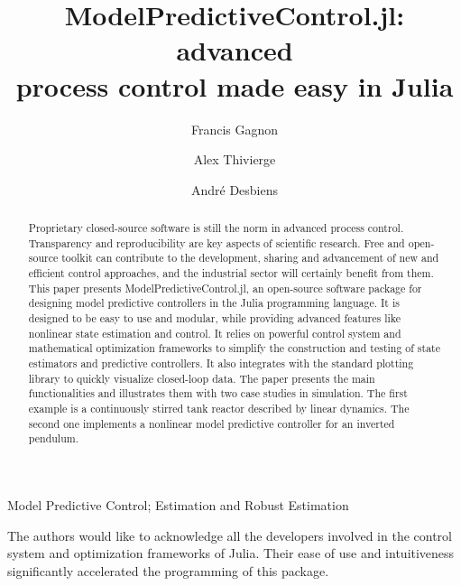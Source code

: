 \documentclass{ifacconf}
\begin{document}
\begin{frontmatter}

\title{ModelPredictiveControl.jl: advanced\\process control made easy in Julia}

\author[First]{Francis Gagnon} 
\author[First]{Alex Thivierge} 
\author[Second]{André Desbiens}
\author[Third]{}

\address[First]{Jumine Inc., Quebec City, QC, G1S 2K4, Canada}
\address[Second]{Process Observation and Optimization Laboratory (LOOP), Université Laval, Quebec City, QC, G1V 0A6, Canada}
\address[Third]{}

\begin{abstract} 
Proprietary closed-source software is still the norm in advanced process control. Transparency and reproducibility are key aspects of scientific research. Free and open-source toolkit can contribute to the development, sharing and advancement of  new and efficient control approaches, and the industrial sector will certainly benefit from them. This paper presents ModelPredictiveControl.jl, an open-source software package for designing model predictive controllers in the Julia programming language. It is designed to be easy to use and modular, while providing advanced features like nonlinear state estimation and control. It relies on powerful control system and mathematical optimization frameworks to simplify the construction and testing of state estimators and predictive controllers. It also integrates with the standard plotting library to quickly visualize closed-loop data. The paper presents the main functionalities and illustrates them with two case studies in simulation. The first example is a continuously stirred tank reactor described by linear dynamics. The second one implements a nonlinear model predictive controller for an inverted pendulum.
\end{abstract}

\begin{keyword}
Model Predictive Control; Estimation and Robust Estimation
\end{keyword}

\end{frontmatter}






\begin{ack}
The authors would like to acknowledge all the developers involved in the control system and optimization frameworks of Julia. Their ease of use and intuitiveness  significantly accelerated the programming of this package.
\end{ack}


\end{document}

